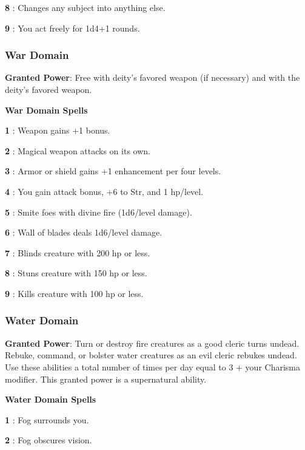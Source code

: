 \textbf{8} : Changes any subject into anything else.

\textbf{9} : You act freely for 1d4+1 rounds.

\subsubsection{War Domain}

\textbf{Granted Power}: Free  with deity's favored weapon (if necessary) and  with the deity's favored weapon.

\textbf{War Domain Spells}

\textbf{1} : Weapon gains +1 bonus.

\textbf{2} : Magical weapon attacks on its own.

\textbf{3} : Armor or shield gains +1 enhancement per four levels.

\textbf{4} : You gain attack bonus, +6 to Str, and 1 hp/level.

\textbf{5} : Smite foes with divine fire (1d6/level damage).

\textbf{6} : Wall of blades deals 1d6/level damage.

\textbf{7} : Blinds creature with 200 hp or less.

\textbf{8} : Stuns creature with 150 hp or less.

\textbf{9} : Kills creature with 100 hp or less.

\subsubsection{Water Domain}

\textbf{Granted Power}: Turn or destroy fire creatures as a good cleric turns undead. Rebuke, command, or bolster water creatures as an evil cleric rebukes undead. Use these abilities a total number of times per day equal to 3 + your Charisma modifier. This granted power is a supernatural ability.

\textbf{Water Domain Spells}

\textbf{1} : Fog surrounds you.

\textbf{2} : Fog obscures vision.

